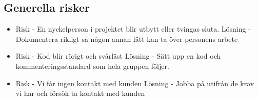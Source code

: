 \subsection{Generella risker}
\begin{itemize}
\item Risk - En nyckelperson i projektet blir utbytt eller tvingas sluta.
Lösning - Dokumentera rikligt så någon annan lätt kan ta över personens arbete
\item Risk - Kod blir rörigt och svårläst
Lösning - Sätt upp en kod och kommenteringsstandard som hela gruppen följer.
\item Risk - Vi får ingen kontakt med kunden
Lösning - Jobba på utifrån de krav vi har och försök ta kontakt med kunden
\end{itemize}



